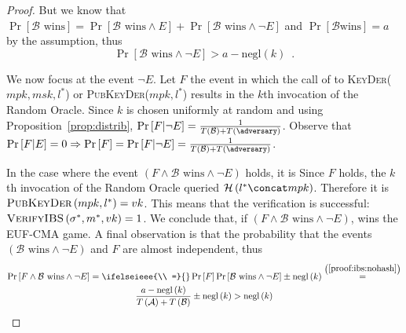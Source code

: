 \begin{proof}
      But we know that $\Pr\left[\mathcal{B} \text{ wins}\right] =
      \Pr\left[\mathcal{B} \text{ wins} \wedge E\right] + \Pr\left[\mathcal{B}
      \text{ wins} \wedge \neg E\right]$ and $\Pr\left[\mathcal{B} \text{
      wins}\right] = a$ by the assumption, thus
      \begin{equation}
        \label{proof:ibs:nohash}
        \Pr\left[\mathcal{B} \text{ wins} \wedge \neg E\right] > a -
        \mathrm{negl}\left(k\right) \enspace.
      \end{equation}

      We now focus at the event $\neg E$. Let $F$ the event in which the call of
      to \textsc{KeyDer}($mpk, msk, l^*$) or \textsc{PubKeyDer}($mpk, l^*$)
      results in the $k$th
      invocation of the Random Oracle. Since $k$ is chosen uniformly at random
      and using Proposition~\ref{prop:distrib},
      $\Pr\left[F | \neg E\right] = \frac{1}{T\left(\mathcal{B}\right) +
      T\left(\adversary\right)}$. Observe that $\Pr\left[F | E\right] = 0
      \Rightarrow \Pr\left[F\right] = \Pr\left[F | \neg E\right] =
      \frac{1}{T\left(\mathcal{B}\right) + T\left(\adversary\right)}$.

      In the case where the event $\left(F \wedge \mathcal{B} \text{ wins}
      \wedge \neg E\right)$ holds, it is
      Since $F$ holds, the $k$th invocation of the Random Oracle queried
      $\mathcal{H}\left(l^* \concat mpk\right)$.
      Therefore it is $\textsc{PubKeyDer}\left(mpk, l^*\right) = vk$. This means
      that the verification is successful: $\textsc{VerifyIBS}\left(\sigma^*,
      m^*, vk\right) = 1$. We conclude that, if $\left(F \wedge
      \mathcal{B} \text{ wins} \wedge \neg E\right)$, \adversary{} wins the
      \textsf{EUF-CMA} game. A final observation is that the probability that
      the events $\left(\mathcal{B} \text{ wins} \wedge \neg E\right)$ and $F$
      are almost independent, thus
      \begin{gather*}
        \Pr\left[F \wedge \mathcal{B} \text{ wins} \wedge \neg E\right] =
        \ifelseieee{\\ =}{}
        \Pr\left[F\right] \Pr\left[\mathcal{B} \text{ wins} \wedge \neg E\right]
        \pm \mathrm{negl}\left(k\right)
        \overset{\left(\ref{proof:ibs:nohash}\right)}{=} \\
        \frac{a - \mathrm{negl}\left(k\right)}{T\left(\mathcal{A}\right) +
        T\left(\mathcal{B}\right)} \pm \mathrm{negl}\left(k\right) >
        \mathrm{negl}\left(k\right)
      \end{gather*}
    \end{proof}
